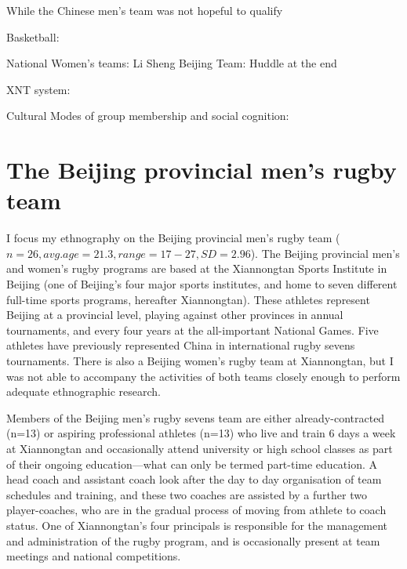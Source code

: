 While the Chinese men's team was not hopeful to qualify






Basketball:



National Women's teams: Li Sheng
Beijing Team: Huddle at the end
















XNT system:



Cultural Modes of group membership and social cognition:
















\section{The Beijing provincial men's rugby team}
I focus my ethnography on the Beijing provincial men's rugby team ($n=26, avg. age=21.3, range = 17-27, SD = 2.96$).  The Beijing provincial men's and women's rugby programs are based at the Xiannongtan Sports Institute in Beijing (one of Beijing's four major sports institutes, and home to seven different full-time sports programs, hereafter Xiannongtan).  These athletes represent Beijing at a provincial level, playing against other provinces in annual tournaments, and every four years at the all-important National Games.  Five athletes have previously represented China in international rugby sevens tournaments.  There is also a Beijing women's rugby team at Xiannongtan, but I was not able to accompany the activities of both teams closely enough to perform adequate ethnographic research.

Members of the Beijing men's rugby sevens team are either already-contracted (n=13) or aspiring professional athletes (n=13) who live and train 6 days a week at Xiannongtan and occasionally attend university or high school classes as part of their ongoing education---what can only be termed part-time education.  A head coach and assistant coach look after the day to day organisation of team schedules and training, and these two coaches are assisted by a further two player-coaches, who are in the gradual process of moving from athlete to coach status.  One of Xiannongtan's four principals is responsible for the management and administration of the rugby program, and is occasionally present at team meetings and national competitions.

